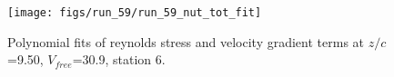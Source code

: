 \begin{figure}[H]
\centering
\texttt{[image: figs/run\_59/run\_59\_nut\_tot\_fit]}
\caption{Polynomial fits of reynolds stress and velocity gradient terms at $z/c$=9.50, $V_{free}$=30.9, station 6.}
\label{fig:run_59_nut_tot_fit}
\end{figure}


